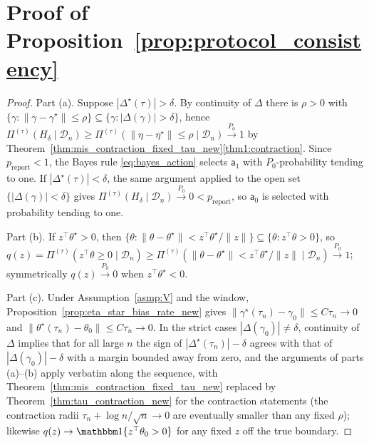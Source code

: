 \documentclass[11pt]{article}
\theoremstyle{definition}
\theoremstyle{plain}
\begin{document}
\section{Proof of Proposition~\ref{prop:protocol_consistency}}\label{proof:prop:protocol_consistency}

\begin{proof}
Part (a). Suppose $|\Delta^\star(\tau)|>\delta$. By continuity of $\Delta$ there is $\rho>0$ with
$\{\gamma:\|\gamma-\gamma^\star\|\le\rho\}\subseteq\{\gamma:|\Delta(\gamma)|>\delta\}$, hence
$\Pi^{(\tau)}(H_\delta\mid\mathcal D_n)\ge\Pi^{(\tau)}(\|\eta-\eta^\star\|\le\rho\mid\mathcal D_n)\xrightarrow{P_0}1$
by Theorem~\ref{thm:mis_contraction_fixed_tau_new}\ref{thm1:contraction}. Since $p_{\mathrm{report}}<1$, the Bayes rule \eqref{eq:bayes_action} selects $\mathsf{a}_1$ with $P_0$-probability tending to one. If $|\Delta^\star(\tau)|<\delta$, the same argument applied to the open set $\{|\Delta(\gamma)|<\delta\}$ gives $\Pi^{(\tau)}(H_\delta\mid\mathcal D_n)\xrightarrow{P_0}0<p_{\mathrm{report}}$, so $\mathsf{a}_0$ is selected with probability tending to one.

Part (b). If $z^\top\theta^\star>0$, then $\{\theta:\|\theta-\theta^\star\|<z^\top\theta^\star/\|z\|\}\subseteq\{\theta:z^\top\theta>0\}$, so $q(z)=\Pi^{(\tau)}(z^\top\theta\ge0\mid\mathcal D_n)\ge\Pi^{(\tau)}(\|\theta-\theta^\star\|<z^\top\theta^\star/\|z\|\mid\mathcal D_n)\xrightarrow{P_0}1$; symmetrically $q(z)\xrightarrow{P_0}0$ when $z^\top\theta^\star<0$.

Part (c). Under Assumption~\ref{asmp:V} and the window, Proposition~\ref{prop:eta_star_bias_rate_new} gives $\|\gamma^\star(\tau_n)-\gamma_0\|\le C\tau_n\to0$ and $\|\theta^\star(\tau_n)-\theta_0\|\le C\tau_n\to0$. In the strict cases $|\Delta(\gamma_0)|\ne\delta$, continuity of $\Delta$ implies that for all large $n$ the sign of $|\Delta^\star(\tau_n)|-\delta$ agrees with that of $|\Delta(\gamma_0)|-\delta$ with a margin bounded away from zero, and the arguments of parts (a)--(b) apply verbatim along the sequence, with Theorem~\ref{thm:mis_contraction_fixed_tau_new} replaced by Theorem~\ref{thm:tau_contraction_new} for the contraction statements (the contraction radii $\tau_n+\log n/\sqrt n\to0$ are eventually smaller than any fixed $\rho$); likewise $q(z)\to\mathbbm 1\{z^\top\theta_0>0\}$ for any fixed $z$ off the true boundary.


\end{proof}
\end{document}

